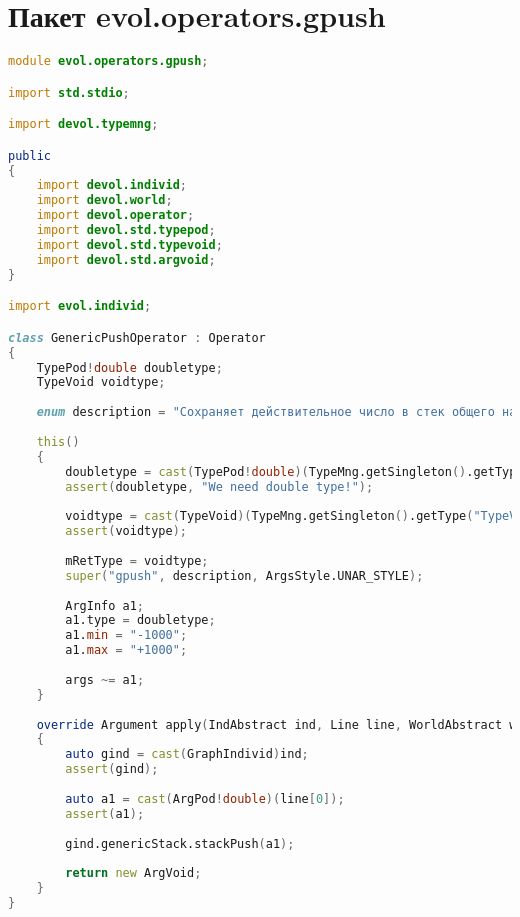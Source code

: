 \documentclass[russian,utf8,emptystyle]{eskdtext}
\begin{document}
\section{Пакет evol.operators.gpush}
\begin{lstlisting}[language=D]
module evol.operators.gpush;

import std.stdio;

import devol.typemng;

public
{
    import devol.individ;
    import devol.world;
    import devol.operator;
    import devol.std.typepod;
    import devol.std.typevoid;
    import devol.std.argvoid;
}

import evol.individ;

class GenericPushOperator : Operator
{
    TypePod!double doubletype;
    TypeVoid voidtype;
    
    enum description = "Сохраняет действительное число в стек общего назначения.";
    
    this()
    {
        doubletype = cast(TypePod!double)(TypeMng.getSingleton().getType("Typedouble"));
        assert(doubletype, "We need double type!");
    
        voidtype = cast(TypeVoid)(TypeMng.getSingleton().getType("TypeVoid"));
        assert(voidtype);
        
        mRetType = voidtype;
        super("gpush", description, ArgsStyle.UNAR_STYLE);
        
        ArgInfo a1;
        a1.type = doubletype;
        a1.min = "-1000";
        a1.max = "+1000";
        
        args ~= a1;
    }
    
    override Argument apply(IndAbstract ind, Line line, WorldAbstract world)
    {
        auto gind = cast(GraphIndivid)ind;
        assert(gind);
        
        auto a1 = cast(ArgPod!double)(line[0]);
        assert(a1);
        
        gind.genericStack.stackPush(a1);
        
        return new ArgVoid;
    }   
}
\end{lstlisting}
\end{document}
